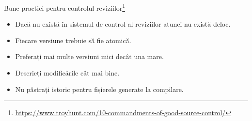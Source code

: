 \documentclass[presentation]{beamer}
\begin{document}
\begin{frame}[label={sec:org027616f}]{Bune practici pentru controlul reviziilor\footnote{\url{https://www.troyhunt.com/10-commandments-of-good-source-control/}}}
\begin{itemize}
\item Dacă nu există în sistemul de control al reviziilor atunci nu există deloc.
\item Fiecare versiune trebuie să fie atomică.
\item Preferați mai multe versiuni mici decât una mare.
\item Descrieți modificările cât mai bine.
\item Nu păstrați istoric pentru fișierele generate la compilare.
\end{itemize}
\end{frame}
\end{document}
